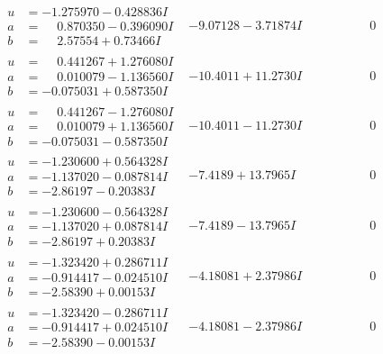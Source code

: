 \documentclass[1p]{elsarticle_modified}
\theoremstyle{definition}
\begin{document}
$$\begin{array}{c|c|c}
\begin{aligned}
u &= -1.275970 - 0.428836 I \\
a &= \phantom{-}0.870350 - 0.396090 I \\
b &= \phantom{-}2.57554 + 0.73466 I\end{aligned}
 & -9.07128 - 3.71874 I & \phantom{-0.000000 } 0 \\ \hline\begin{aligned}
u &= \phantom{-}0.441267 + 1.276080 I \\
a &= \phantom{-}0.010079 - 1.136560 I \\
b &= -0.075031 + 0.587350 I\end{aligned}
 & -10.4011 + 11.2730 I & \phantom{-0.000000 } 0 \\ \hline\begin{aligned}
u &= \phantom{-}0.441267 - 1.276080 I \\
a &= \phantom{-}0.010079 + 1.136560 I \\
b &= -0.075031 - 0.587350 I\end{aligned}
 & -10.4011 - 11.2730 I & \phantom{-0.000000 } 0 \\ \hline\begin{aligned}
u &= -1.230600 + 0.564328 I \\
a &= -1.137020 - 0.087814 I \\
b &= -2.86197 - 0.20383 I\end{aligned}
 & -7.4189 + 13.7965 I & \phantom{-0.000000 } 0 \\ \hline\begin{aligned}
u &= -1.230600 - 0.564328 I \\
a &= -1.137020 + 0.087814 I \\
b &= -2.86197 + 0.20383 I\end{aligned}
 & -7.4189 - 13.7965 I & \phantom{-0.000000 } 0 \\ \hline\begin{aligned}
u &= -1.323420 + 0.286711 I \\
a &= -0.914417 - 0.024510 I \\
b &= -2.58390 + 0.00153 I\end{aligned}
 & -4.18081 + 2.37986 I & \phantom{-0.000000 } 0 \\ \hline\begin{aligned}
u &= -1.323420 - 0.286711 I \\
a &= -0.914417 + 0.024510 I \\
b &= -2.58390 - 0.00153 I\end{aligned}
 & -4.18081 - 2.37986 I & \phantom{-0.000000 } 0\\

\end{array}$$
\end{document}
